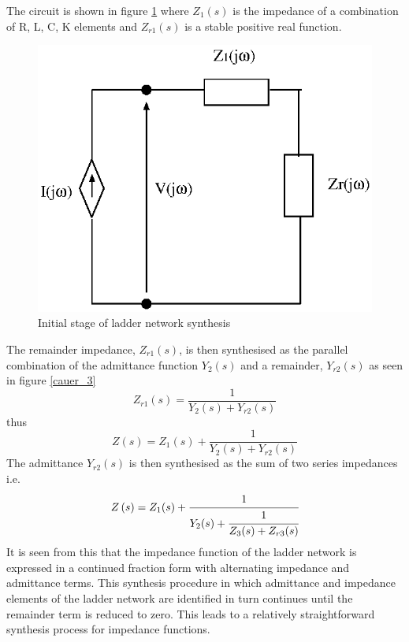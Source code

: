 The circuit is shown in figure \ref{cauer_2} where $Z_1(s)$ is the impedance of a combination of R, L, C, K elements and $Z_{r1}(s)$ is a stable positive real function.
%
\begin{figure}[ht]
\centering
\includegraphics[scale=0.7]{./Imgs/cauer_2.eps}
\caption{Initial stage of ladder network synthesis}
\label{cauer_2}
\end{figure}
%
The remainder impedance, $Z_{r1}(s)$, is then synthesised as the parallel combination of the admittance function  $Y_2(s)$ and a remainder, $Y_{r2}(s)$ as seen in figure \ref{cauer_3}
%
\begin{equation} \label{eq:cauer_2a}
Z_{r1}(s)=\frac{1}{Y_2(s)+Y_{r2}(s)}
\end{equation}
%
thus
%
\begin{equation} \label{eq:cauer_2b}
Z\left(s\right)=Z_1(s)+\frac{1}{Y_2(s)+Y_{r2}(s)}
\end{equation}
%
The admittance $Y_{r2}(s)$ is then synthesised as the sum of two series impedances i.e. 
%
\begin{equation} \label{eq:cauer_2c}
Z\left(s\right)=Z_1(s)+\cfrac{1}{Y_2(s)+  \cfrac{1}{Z_3(s)+ Z_{r3}(s)  } }
\end{equation}
%
It is seen from this that the impedance function of the ladder network is expressed in a continued fraction form with alternating impedance and admittance terms. 
This synthesis procedure in which admittance and impedance elements of the ladder network are identified in turn continues until the remainder term is reduced to zero. This leads to a relatively straightforward synthesis process for impedance functions.

